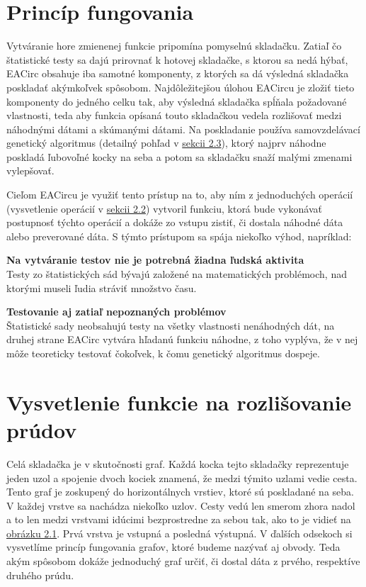 \section{Princíp fungovania}
\label{sec:principle}

Vytváranie hore zmienenej funkcie pripomína pomyselnú skladačku. Zatiaľ čo štatistické testy sa dajú prirovnať k hotovej skladačke, s ktorou sa nedá hýbať, EACirc obsahuje iba samotné komponenty, z ktorých sa dá výsledná skladačka poskladať akýmkoľvek spôsobom. Najdôležitejšou úlohou EACircu je zložiť tieto komponenty do jedného celku tak, aby výsledná skladačka spĺňala požadované vlastnosti, teda aby funkcia opísaná touto skladačkou vedela rozlišovať medzi náhodnými dátami a skúmanými dátami. Na poskladanie používa samovzdelávací genetický algoritmus (detailný pohľad v \hyperref[sec:genetics]{sekcii 2.3}), ktorý najprv náhodne poskladá ľubovoľné kocky na seba a potom sa skladačku snaží malými zmenami vylepšovať.

Cieľom EACircu je využiť tento prístup na to, aby ním z jednoduchých operácií (vysvetlenie operácií v \hyperref[sec:nodes]{sekcii 2.2}) vytvoril funkciu, ktorá bude vykonávať postupnosť týchto operácií a dokáže zo vstupu zistiť, či dostala náhodné dáta alebo preverované dáta. S týmto prístupom sa spája niekoľko výhod, napríklad:
\begin{myItemize}
	\item \textbf{Na vytváranie testov nie je potrebná žiadna ľudská aktivita}\\Testy zo štatistických sád bývajú založené na matematických problémoch, nad ktorými museli ľudia stráviť množstvo času.
	\item \textbf{Testovanie aj zatiaľ nepoznaných problémov}\\Štatistické sady neobsahujú testy na všetky vlastnosti nenáhodných dát, na druhej strane EACirc vytvára hľadanú funkciu náhodne, z toho vyplýva, že v nej môže teoreticky testovať čokoľvek, k čomu genetický algoritmus dospeje.
\end{myItemize}

\section{Vysvetlenie funkcie na rozlišovanie prúdov}
\label{sec:nodes}

Celá skladačka je v skutočnosti graf. Každá kocka tejto skladačky reprezentuje jeden uzol a spojenie dvoch kociek znamená, že medzi týmito uzlami vedie cesta. Tento graf je zoskupený do horizontálnych vrstiev, ktoré sú poskladané na seba. V každej vrstve sa nachádza niekoľko uzlov. Cesty vedú len smerom zhora nadol a to len medzi vrstvami idúcimi bezprostredne za sebou tak, ako to je vidieť na \hyperref[obr:circuit-example]{obrázku 2.1}. Prvá vrstva je vstupná a posledná výstupná. V ďalších odsekoch si vysvetlíme princíp fungovania grafov, ktoré budeme nazývať aj obvody. Teda akým spôsobom dokáže jednoduchý graf určiť, či dostal dáta z prvého, respektíve druhého prúdu. 

